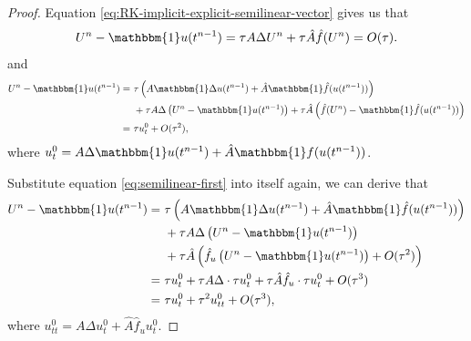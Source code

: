 \documentclass[a4paper, oneside]{book}
\def\bbone{{\mathbbm{1}}}
\def\hatA{{\hat{A}}}
\def\hatf{{\hat{f}}}
\begin{document}
\begin{proof}

Equation \eqref{eq:RK-implicit-explicit-semilinear-vector} gives us that 
\begin{equation}\label{eq:semilinear-start}
    U^n - \bbone u(t^{n-1}) = \tau A \Delta U^n + \tau \hatA \hatf(U^n) = O(\tau).
\end{equation}
and 
\begin{equation}\label{eq:semilinear-first}
    \begin{aligned}
    U^n - \bbone u(t^{n-1}) =~& \tau \left(A  \bbone\Delta u(t^{n-1}) + \hatA \bbone \hatf(u(t^{n-1})) \right)\\
    &+ \tau A \Delta\left(U^n - \bbone u(t^{n-1})\right) + \tau \hatA \left(\hatf(U^n) - \bbone \hatf(u(t^{n-1}))\right)\\
    =~& \tau u_t^0 + O(\tau^2), 
    \end{aligned}
\end{equation}
where $u_t^0 = A \Delta \bbone u(t^{n-1}) + \hatA \bbone f(u(t^{n-1}))$. 

Substitute equation \eqref{eq:semilinear-first} into itself again, 
we can derive that 
\begin{equation}\label{eq:semilinear-second}
    \begin{aligned}
    U^n - \bbone u(t^{n-1}) =~& \tau \left(A  \bbone\Delta u(t^{n-1}) + \hatA \bbone \hatf(u(t^{n-1})) \right)\\
    &+ \tau A \Delta\left(U^n - \bbone u(t^{n-1})\right) \\
    &+ \tau \hatA \left(\hatf_u\left(U^n - \bbone u(t^{n-1})\right) + O(\tau^2)\right)\\
    =~& \tau u_t^0 + \tau A\Delta \cdot \tau u_t^0 + \tau \hatA \hatf_u \cdot \tau u_t^0  + O(\tau^3)\\
    =~& \tau u_t^0 + \tau^2 u_{tt}^0 + O(\tau^3), 
    \end{aligned}
\end{equation}
where $u_{tt}^0 = A \Delta u_t^0 + \hatA \hatf_u u_t^0$. 


\end{proof}
\end{document}
